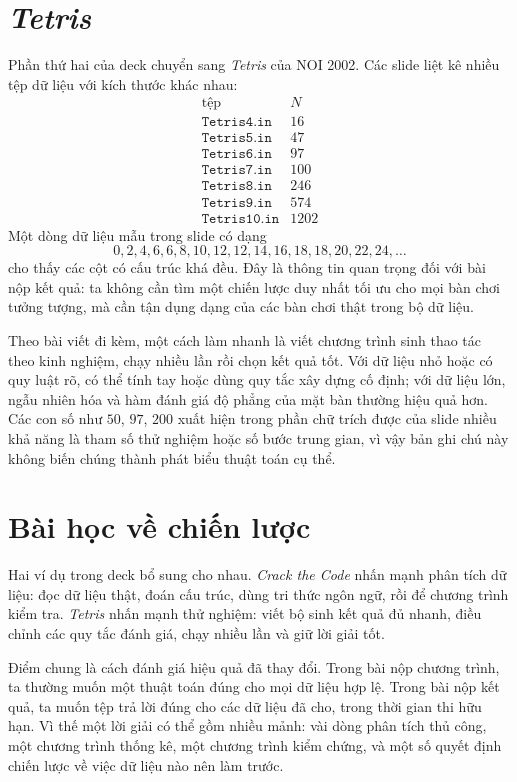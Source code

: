 \documentclass[11pt]{article}
\begin{document}
\section{\textit{Tetris}}

Phần thứ hai của deck chuyển sang \textit{Tetris} của NOI 2002. Các slide
liệt kê nhiều tệp dữ liệu với kích thước khác nhau:
\[
\begin{array}{c|c}
\text{tệp} & N\\ \hline
\texttt{Tetris4.in} & 16\\
\texttt{Tetris5.in} & 47\\
\texttt{Tetris6.in} & 97\\
\texttt{Tetris7.in} & 100\\
\texttt{Tetris8.in} & 246\\
\texttt{Tetris9.in} & 574\\
\texttt{Tetris10.in} & 1202
\end{array}
\]
Một dòng dữ liệu mẫu trong slide có dạng
\[
  0,2,4,6,6,8,10,12,12,14,16,18,18,20,22,24,\ldots
\]
cho thấy các cột có cấu trúc khá đều. Đây là thông tin quan trọng đối với bài
nộp kết quả: ta không cần tìm một chiến lược duy nhất tối ưu cho mọi bàn chơi
tưởng tượng, mà cần tận dụng dạng của các bàn chơi thật trong bộ dữ liệu.

Theo bài viết đi kèm, một cách làm nhanh là viết chương trình sinh thao tác
theo kinh nghiệm, chạy nhiều lần rồi chọn kết quả tốt. Với dữ liệu nhỏ hoặc
có quy luật rõ, có thể tính tay hoặc dùng quy tắc xây dựng cố định; với dữ
liệu lớn, ngẫu nhiên hóa và hàm đánh giá độ phẳng của mặt bàn thường hiệu
quả hơn. Các con số như \(50\), \(97\), \(200\) xuất hiện trong phần chữ trích
được của slide nhiều khả năng là tham số thử nghiệm hoặc số bước trung gian,
vì vậy bản ghi chú này không biến chúng thành phát biểu thuật toán cụ thể.

\section{Bài học về chiến lược}

Hai ví dụ trong deck bổ sung cho nhau. \textit{Crack the Code} nhấn mạnh phân
tích dữ liệu: đọc dữ liệu thật, đoán cấu trúc, dùng tri thức ngôn ngữ, rồi để
chương trình kiểm tra. \textit{Tetris} nhấn mạnh thử nghiệm: viết bộ sinh kết
quả đủ nhanh, điều chỉnh các quy tắc đánh giá, chạy nhiều lần và giữ lời giải
tốt.

Điểm chung là cách đánh giá hiệu quả đã thay đổi. Trong bài nộp chương trình,
ta thường muốn một thuật toán đúng cho mọi dữ liệu hợp lệ. Trong bài nộp kết
quả, ta muốn tệp trả lời đúng cho các dữ liệu đã cho, trong thời gian thi hữu
hạn. Vì thế một lời giải có thể gồm nhiều mảnh: vài dòng phân tích thủ công,
một chương trình thống kê, một chương trình kiểm chứng, và một số quyết định
chiến lược về việc dữ liệu nào nên làm trước.
\end{document}
